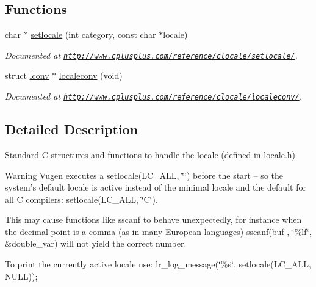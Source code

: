 \subsection*{Functions}
\begin{DoxyCompactItemize}
\item 
\hypertarget{group__locale_gafe784c4f5d12b74272740c5211c960c5}{char $\ast$ \hyperlink{group__locale_gafe784c4f5d12b74272740c5211c960c5}{setlocale} (int category, const char $\ast$locale)}\label{group__locale_gafe784c4f5d12b74272740c5211c960c5}

\begin{DoxyCompactList}\small\item\em Documented at \href{http://www.cplusplus.com/reference/clocale/setlocale/}{\tt http\-://www.\-cplusplus.\-com/reference/clocale/setlocale/}. \end{DoxyCompactList}\item 
\hypertarget{group__locale_ga69b40f71a20a7c8bd67b9eeeae7f40c9}{struct \hyperlink{structlconv}{lconv} $\ast$ \hyperlink{group__locale_ga69b40f71a20a7c8bd67b9eeeae7f40c9}{localeconv} (void)}\label{group__locale_ga69b40f71a20a7c8bd67b9eeeae7f40c9}

\begin{DoxyCompactList}\small\item\em Documented at \href{http://www.cplusplus.com/reference/clocale/localeconv/}{\tt http\-://www.\-cplusplus.\-com/reference/clocale/localeconv/}. \end{DoxyCompactList}\end{DoxyCompactItemize}


\subsection{Detailed Description}
Standard C structures and functions to handle the locale (defined in locale.\-h) \begin{DoxyWarning}{Warning}
Vugen executes a setlocale(L\-C\-\_\-\-A\-L\-L, \char`\"{}\char`\"{}) before the start -- so the system's default locale is active instead of the minimal locale and the default for all C compilers\-: setlocale(L\-C\-\_\-\-A\-L\-L, \char`\"{}\-C\char`\"{}). \par
This may cause functions like sscanf to behave unexpectedly, for instance when the decimal point is a comma (as in many European languages) sscanf(buf , \char`\"{}\%lf\char`\"{}, \&double\-\_\-var) will not yield the correct number. \par
To print the currently active locale use\-: lr\-\_\-log\-\_\-message(\char`\"{}\%s\char`\"{}, setlocale(\-L\-C\-\_\-\-A\-L\-L, N\-U\-L\-L)); 
\end{DoxyWarning}

